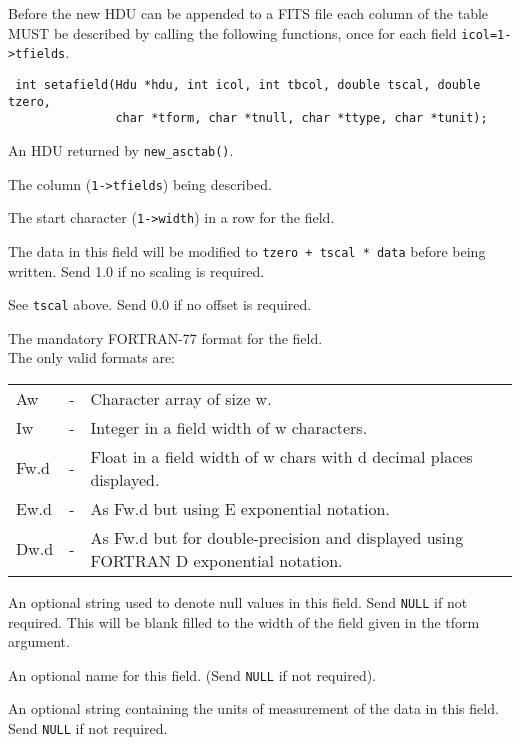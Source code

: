 Before the new HDU can be appended to a FITS file each column of the
table MUST be described by calling the following functions, once for
each field \verb`icol=1->tfields`.
\label{setafield}\begin{verbatim}
 int setafield(Hdu *hdu, int icol, int tbcol, double tscal, double tzero,
               char *tform, char *tnull, char *ttype, char *tunit);
\end{verbatim}
\begin{arglist}

 An HDU returned by \verb`new_asctab()`.

 The column (\verb`1->tfields`) being described.

 The start character (\verb`1->width`) in a row for
            the field. 

 The data in this field will be modified to
            \verb`tzero + tscal * data` before being written. Send
            1.0 if no scaling is required.

 See \verb`tscal` above. Send 0.0 if no offset is
            required. 

 The mandatory FORTRAN-77 format for the field.\\
            The only valid formats are:\nopagebreak

    	    \begin{tabular}{lcp{4.75in}}
              Aw   & - & Character array of size w. \\
              Iw   & - & Integer in a field width of w characters. \\
              Fw.d & - & Float in a field width of w chars with
                         d decimal places displayed. \\
              Ew.d & - & As Fw.d but using E exponential notation. \\
              Dw.d & - & As Fw.d but for double-precision and displayed
                         using FORTRAN D exponential notation. \\
            \end{tabular}

 An optional string used to denote null values in this
             field. Send \verb`NULL` if not required. This will be blank
             filled to the width of the field given in the tform
             argument.

 An optional name for this field. (Send \verb`NULL` if not required). 

 An optional string containing the units of measurement
             of the data in this field. Send \verb`NULL` if not required.
\end{arglist}

